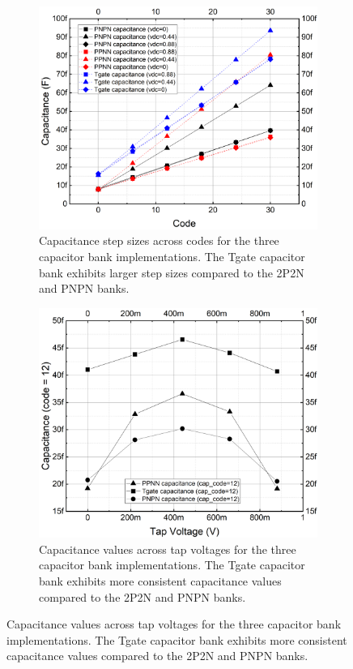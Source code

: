\begin{figure}[htbp]
  \begin{subfigure}[t]{0.45\linewidth}
    \centering
    \includegraphics[width=\linewidth]{figures/Results/Cap_tests-CapVsCode.png}
    \caption{Capacitance step sizes across codes for the three capacitor bank implementations. The Tgate capacitor bank exhibits larger step sizes compared to the 2P2N and PNPN banks.}
    \label{fig:cap_vs_codes}
  \end{subfigure}
  \hfill
  \begin{subfigure}[t]{0.45\linewidth}
    \centering
    \includegraphics[width=\linewidth]{figures/Results/Cap_tests-CapVsVoltage.png}
    \caption{Capacitance values across tap voltages for the three capacitor bank implementations. The Tgate capacitor bank exhibits more consistent capacitance values compared to the 2P2N and PNPN banks.}
    \label{fig:cap_vs_tap_voltage}
  \end{subfigure}
\end{figure}

